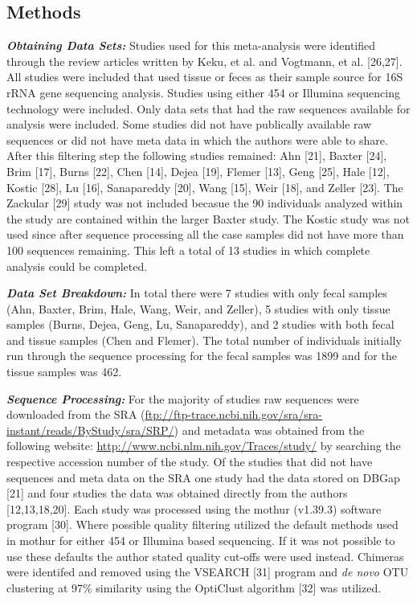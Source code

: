 \documentclass[12pt,]{article}
\begin{document}
\newpage

\subsection{Methods}\label{methods}

\textbf{\emph{Obtaining Data Sets:}} Studies used for this meta-analysis
were identified through the review articles written by Keku, et al. and
Vogtmann, et al. {[}26,27{]}. All studies were included that used tissue
or feces as their sample source for 16S rRNA gene sequencing analysis.
Studies using either 454 or Illumina sequencing technology were
included. Only data sets that had the raw sequences available for
analysis were included. Some studies did not have publically available
raw sequences or did not have meta data in which the authors were able
to share. After this filtering step the following studies remained: Ahn
{[}21{]}, Baxter {[}24{]}, Brim {[}17{]}, Burns {[}22{]}, Chen {[}14{]},
Dejea {[}19{]}, Flemer {[}13{]}, Geng {[}25{]}, Hale {[}12{]}, Kostic
{[}28{]}, Lu {[}16{]}, Sanapareddy {[}20{]}, Wang {[}15{]}, Weir
{[}18{]}, and Zeller {[}23{]}. The Zackular {[}29{]} study was not
included becasue the 90 individuals analyzed within the study are
contained within the larger Baxter study. The Kostic study was not used
since after sequence processing all the case samples did not have more
than 100 sequences remaining. This left a total of 13 studies in which
complete analysis could be completed.

\textbf{\emph{Data Set Breakdown:}} In total there were 7 studies with
only fecal samples (Ahn, Baxter, Brim, Hale, Wang, Weir, and Zeller), 5
studies with only tissue samples (Burns, Dejea, Geng, Lu, Sanapareddy),
and 2 studies with both fecal and tissue samples (Chen and Flemer). The
total number of individuals initially run through the sequence
processing for the fecal samples was 1899 and for the tissue samples was
462.

\textbf{\emph{Sequence Processing:}} For the majority of studies raw
sequences were downloaded from the SRA
(\url{ftp://ftp-trace.ncbi.nih.gov/sra/sra-instant/reads/ByStudy/sra/SRP/})
and metadata was obtained from the following website:
\url{http://www.ncbi.nlm.nih.gov/Traces/study/} by searching the
respective accession number of the study. Of the studies that did not
have sequences and meta data on the SRA one study had the data stored on
DBGap {[}21{]} and four studies the data was obtained directly from the
authors {[}12,13,18,20{]}. Each study was processed using the mothur
(v1.39.3) software program {[}30{]}. Where possible quality filtering
utilized the default methods used in mothur for either 454 or Illumina
based sequencing. If it was not possible to use these defaults the
author stated quality cut-offs were used instead. Chimeras were
identifed and removed using the VSEARCH {[}31{]} program and \emph{de
novo} OTU clustering at 97\% similarity using the OptiClust algorithm
{[}32{]} was utilized.
\end{document}
